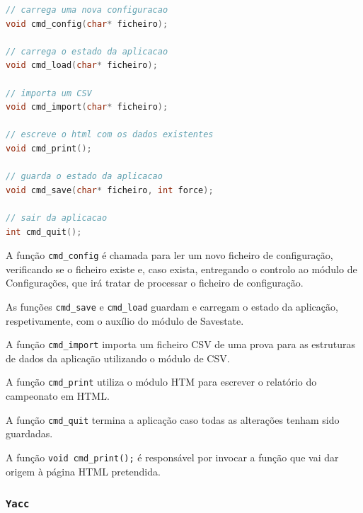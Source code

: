 \documentclass[11pt, a4paper, oneside]{article}
\begin{document}
\begin{lstlisting}[language=C, caption={Construtores do módulo de comandos.}]
// carrega uma nova configuracao
void cmd_config(char* ficheiro);

// carrega o estado da aplicacao
void cmd_load(char* ficheiro);

// importa um CSV
void cmd_import(char* ficheiro);

// escreve o html com os dados existentes
void cmd_print();

// guarda o estado da aplicacao
void cmd_save(char* ficheiro, int force);

// sair da aplicacao
int cmd_quit();
\end{lstlisting} 

A função \texttt{cmd\_config} é chamada para ler um novo ficheiro de configuração, verificando se o ficheiro existe e, caso exista, entregando o controlo ao módulo de Configurações, que irá tratar de processar o ficheiro de configuração.

As funções \texttt{cmd\_save} e \texttt{cmd\_load} guardam e carregam o estado da aplicação, respetivamente, com o auxílio do módulo de Savestate.

A função \texttt{cmd\_import} importa um ficheiro CSV de uma prova para as estruturas de dados da aplicação utilizando o módulo de CSV.

A função \texttt{cmd\_print} utiliza o módulo HTM para escrever o relatório do campeonato em HTML.

A função \texttt{cmd\_quit} termina a aplicação caso todas as alterações tenham sido guardadas.

A função \texttt{void cmd\_print();} é responsável por invocar a função que vai dar origem à página HTML pretendida.

\newpage
\subsubsection[Yacc]{\texttt{Yacc}}
\end{document}
